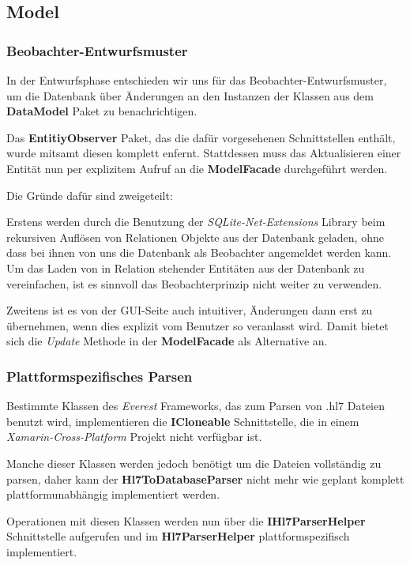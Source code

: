\documentclass[a4paper]{scrreprt}
\begin{document}
\subsection{Model}
\subsubsection{Beobachter-Entwurfsmuster}
In der Entwurfsphase entschieden wir uns für das Beobachter-Entwurfsmuster, um die Datenbank über Änderungen an den Instanzen der Klassen aus dem \textbf{DataModel} Paket zu benachrichtigen.

Das \textbf{EntitiyObserver} Paket, das die dafür vorgesehenen Schnittstellen enthält, wurde mitsamt diesen komplett enfernt. Stattdessen muss das Aktualisieren einer Entität nun per explizitem Aufruf an die \textbf{ModelFacade} durchgeführt werden.

Die Gründe dafür sind zweigeteilt:

Erstens werden durch die Benutzung der \textit{SQLite-Net-Extensions} Library beim rekursiven Auflösen von Relationen Objekte aus der Datenbank geladen, ohne dass bei ihnen von uns die Datenbank als Beobachter angemeldet werden kann. Um das Laden von in Relation stehender Entitäten aus der Datenbank zu vereinfachen, ist es sinnvoll das Beobachterprinzip nicht weiter zu verwenden.

Zweitens ist es von der GUI-Seite auch intuitiver, Änderungen dann erst zu übernehmen, wenn dies explizit vom Benutzer so veranlasst wird. Damit bietet sich die \textit{Update} Methode in der \textbf{ModelFacade} als Alternative an.

\subsubsection{Plattformspezifisches Parsen}
Bestimmte Klassen des \textit{Everest} Frameworks, das zum Parsen von .hl7 Dateien benutzt wird, implementieren die \textbf{ICloneable} Schnittstelle, die in einem \textit{Xamarin-Cross-Platform} Projekt nicht verfügbar ist. 

Manche dieser Klassen werden jedoch benötigt um die Dateien vollständig zu parsen, daher kann der \textbf{Hl7ToDatabaseParser} nicht mehr wie geplant komplett plattformunabhängig implementiert werden.

Operationen mit diesen Klassen werden nun über die \textbf{IHl7ParserHelper} Schnittstelle aufgerufen und im \textbf{Hl7ParserHelper} plattformspezifisch implementiert.
\end{document}
